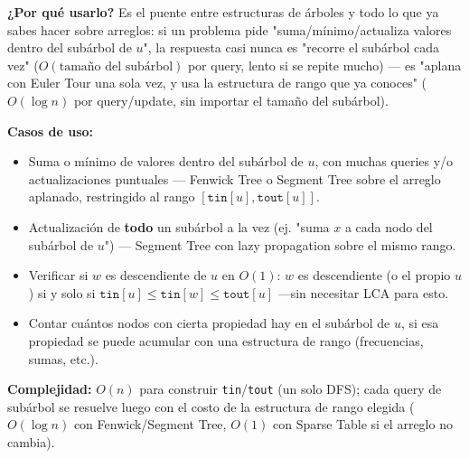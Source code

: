 \documentclass[10pt,a4paper,twocolumn]{article}
\begin{document}
\textbf{¿Por qué usarlo?} Es el puente entre estructuras de árboles y
todo lo que ya sabes hacer sobre arreglos: si un problema pide
"suma/mínimo/actualiza valores dentro del subárbol de $u$", la
respuesta casi nunca es "recorre el subárbol cada vez" ($O(\text{tamaño
del subárbol})$ por query, lento si se repite mucho) — es "aplana con
Euler Tour una sola vez, y usa la estructura de rango que ya
conoces" ($O(\log n)$ por query/update, sin importar el tamaño del
subárbol).

\textbf{Casos de uso:}

\begin{itemize}
    \item Suma o mínimo de valores dentro del subárbol de $u$, con
    muchas queries y/o actualizaciones puntuales — Fenwick Tree o
    Segment Tree sobre el arreglo aplanado, restringido al rango
    $[\texttt{tin}[u], \texttt{tout}[u]]$.
    \item Actualización de \textbf{todo} un subárbol a la vez (ej.
    "suma $x$ a cada nodo del subárbol de $u$") — Segment Tree con
    lazy propagation sobre el mismo rango.
    \item Verificar si $w$ es descendiente de $u$ en $O(1)$:
    $w$ es descendiente (o el propio $u$) si y solo si
    $\texttt{tin}[u] \le \texttt{tin}[w] \le \texttt{tout}[u]$ —sin
    necesitar LCA para esto.
    \item Contar cuántos nodos con cierta propiedad hay en el
    subárbol de $u$, si esa propiedad se puede acumular con una
    estructura de rango (frecuencias, sumas, etc.).
\end{itemize}

\textbf{Complejidad:} $O(n)$ para construir \texttt{tin}/\texttt{tout}
(un solo DFS); cada query de subárbol se resuelve luego con el costo
de la estructura de rango elegida ($O(\log n)$ con Fenwick/Segment
Tree, $O(1)$ con Sparse Table si el arreglo no cambia).
\end{document}
